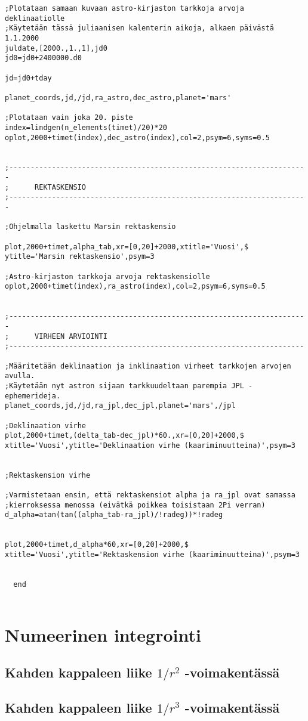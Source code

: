 \documentclass[12pt, a4paper]{article}
\begin{document}
\begin{small}
\begin{verbatim}
;Plotataan samaan kuvaan astro-kirjaston tarkkoja arvoja deklinaatiolle
;Käytetään tässä juliaanisen kalenterin aikoja, alkaen päivästä 1.1.2000
juldate,[2000.,1.,1],jd0
jd0=jd0+2400000.d0

jd=jd0+tday

planet_coords,jd,/jd,ra_astro,dec_astro,planet='mars'

;Plotataan vain joka 20. piste
index=lindgen(n_elements(timet)/20)*20
oplot,2000+timet(index),dec_astro(index),col=2,psym=6,syms=0.5


;----------------------------------------------------------------------
;      REKTASKENSIO
;----------------------------------------------------------------------

;Ohjelmalla laskettu Marsin rektaskensio

plot,2000+timet,alpha_tab,xr=[0,20]+2000,xtitle='Vuosi',$
ytitle='Marsin rektaskensio',psym=3

;Astro-kirjaston tarkkoja arvoja rektaskensiolle
oplot,2000+timet(index),ra_astro(index),col=2,psym=6,syms=0.5


;----------------------------------------------------------------------
;      VIRHEEN ARVIOINTI
;---------------------------------------------------------------------

;Määritetään deklinaation ja inklinaation virheet tarkkojen arvojen avulla.
;Käytetään nyt astron sijaan tarkkuudeltaan parempia JPL -ephemerideja.
planet_coords,jd,/jd,ra_jpl,dec_jpl,planet='mars',/jpl

;Deklinaation virhe
plot,2000+timet,(delta_tab-dec_jpl)*60.,xr=[0,20]+2000,$
xtitle='Vuosi',ytitle='Deklinaation virhe (kaariminuutteina)',psym=3


;Rektaskension virhe

;Varmistetaan ensin, että rektaskensiot alpha ja ra_jpl ovat samassa
;kierroksessa menossa (eivätkä poikkea toisistaan 2Pi verran)
d_alpha=atan(tan((alpha_tab-ra_jpl)/!radeg))*!radeg


plot,2000+timet,d_alpha*60,xr=[0,20]+2000,$
xtitle='Vuosi',ytitle='Rektaskension virhe (kaariminuutteina)',psym=3


  end


\end{verbatim}
\end{small}

\newpage

\section[Tehtävä 2]{Numeerinen integrointi}

\subsection[Tehtävä 2a]{Kahden kappaleen liike $1/r^2$ -voimakentässä}

\subsection[Tehtävä 2b]{Kahden kappaleen liike $1/r^3$ -voimakentässä}
\end{document}
